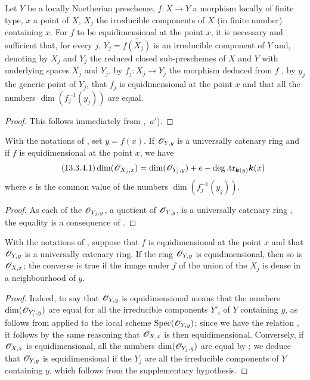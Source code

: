 \begin{proposition}[13.3.3]
\label{IV.13.3.3}
Let $Y$ be a locally Noetherian prescheme, $f:X\to Y$ a morphism locally of finite type, $x$ a point of $X$, $X_j$ the irreducible components of $X$ (in finite number) containing $x$.
For $f$ to be equidimensional at the point $x$, it is necessary and sufficient that, for every $j$, $Y_j=\overline{f(X_j)}$ is an irreducible component of $Y$ and, denoting by $X_j$ and $Y_j$ the reduced closed sub-preschemes of $X$ and $Y$ with underlying spaces $X_j$ and $Y_j$, by $f_j:X_j\to Y_j$ the morphism deduced from $f$ , by $y_j$ the generic point of $Y_j$, that $f_j$ is equidimensional at the point $x$ and that all the numbers $\dim(f_j^{-1}(y_j))$ are equal.
\end{proposition}

\begin{proof}
This follows immediately from ,~$a'$).
\end{proof}

\begin{corollary}[13.3.4]
\label{IV.13.3.4}
With the notations of , set $y=f(x)$.
If $\mathscr{O}_{Y,y}$ is a universally catenary ring and if $f$ is equidimensional at the point $x$, we have
\[
\tag{13.3.4.1}
\label{IV.13.3.4.1}
  \dim(\mathscr{O}_{X_j,x})=\dim(\mathscr{O}_{Y_j,y})+e-\deg.\mathrm{tr}_{\boldsymbol{k}(y)}\boldsymbol{k}(x)
\]
where $e$ is the common value of the numbers $\dim(f_j^{-1}(y_j))$.
\end{corollary}

\begin{proof}
As each of the $\mathscr{O}_{Y_j,y}$, a quotient of $\mathscr{O}_{Y,y}$, is a universally catenary ring , the equality is a consequence of .
\end{proof}

\begin{corollary}[13.3.5]
\label{IV.13.3.5}
With the notations of , suppose that $f$ is equidimensional at the point $x$ and that $\mathscr{O}_{Y,y}$ is a universally catenary ring.
If the ring $\mathscr{O}_{Y,y}$ is equidimensional, then so is $\mathscr{O}_{X,x}$; the converse is true if the image under $f$ of the union of the $X_j$ is dense in a neighbourhood of $y$.
\end{corollary}

\begin{proof}
Indeed, to say that $\mathscr{O}_{Y,y}$ is equidimensional means that the numbers $\dim(\mathscr{O}_{Y'_i,y})$ are equal for all the irreducible components $Y'_i$ of $Y$ containing $y$, as follows from  applied to the local scheme $\operatorname{Spec}(\mathscr{O}_{Y,y})$; since we have the relation , it follows by the same reasoning that $\mathscr{O}_{X,x}$ is then equidimensional.
Conversely, if $\mathscr{O}_{X,x}$ is equidimensional, all the numbers $\dim(\mathscr{O}_{Y_j,y})$ are equal by ; we deduce that $\mathscr{O}_{Y,y}$ is equidimensional if the $Y_j$ are all the irreducible components of $Y$ containing $y$, which follows from the supplementary hypothesis.
\end{proof}

